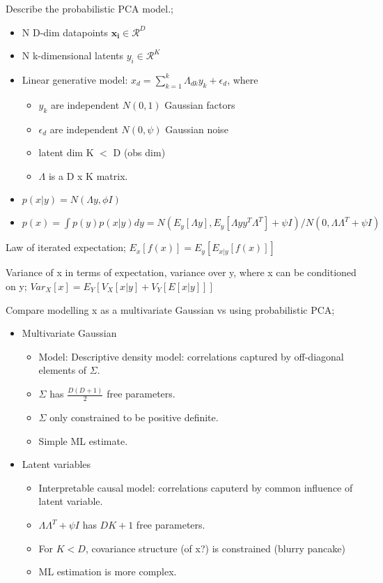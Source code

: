 \documentclass{article}
\begin{document}
Describe the probabilistic PCA model.; \begin{itemize} \item N D-dim datapoints $\mathbf{x_i} \in \mathcal{R}^D$ \item N k-dimensional latents $y_i \in \mathcal{R}^K$ \item Linear generative model: $x_d = \sum_{k=1}^k \Lambda_{dk}y_k + \epsilon_d$, where \begin{itemize} \item $y_k$ are independent $N(0,1)$ Gaussian factors \item $\epsilon_d$ are independent $N(0,\psi)$ Gaussian noise \item latent dim K $<$ D (obs dim) \item $\Lambda$ is a D x K matrix.  \end{itemize} \item $p(x|y) = N(\Lambda y,\phi I)$ \item $p(x) = \int p(y)p(x|y)dy = N(E_y[\Lambda y], E_y[\Lambda y y^T\Lambda^T]+\psi I)/N(0,\Lambda\Lambda^T+\psi I)$ \end{itemize}

Law of iterated expectation; $E_x[f(x)] = E_y[E_{x|y}[f(x)]]$

Variance of x in terms of expectation, variance over y, where x can be conditioned on y; $Var_X[x] = E_Y[V_X[x|y] + V_Y[E[x|y]]]$

Compare modelling x as a multivariate Gaussian vs using probabilistic PCA; \begin{itemize}\item Multivariate Gaussian \begin{itemize} \item Model: Descriptive density model: correlations captured by off-diagonal elements of $\Sigma$.  \item $\Sigma$ has $\frac{D(D+1)}{2}$ free parameters.  \item $\Sigma$ only constrained to be positive definite.  \item Simple ML estimate.  \end{itemize} \item Latent variables \begin{itemize} \item Interpretable causal model: correlations caputerd by common influence of latent variable.  \item $\Lambda\Lambda^T +\psi I$ has $DK+1$ free parameters.  \item For $K < D$, covariance structure (of x?) is constrained (blurry pancake) \item ML estimation is more complex.  \end{itemize} \end{itemize}
\end{document}
